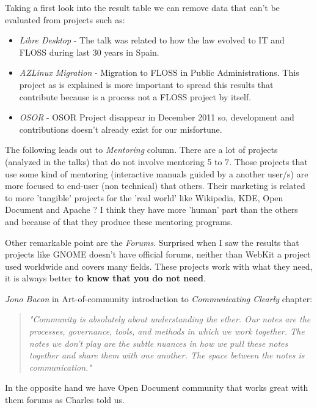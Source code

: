 \documentclass[11pt]{scrartcl}
\begin{document}
\par Taking a first look into the result table we can remove data that can't be evaluated from projects such as:
\begin{itemize}
	\item \emph{Libre Desktop} - The talk was related to how the law evolved to IT and FLOSS during last 30 years in Spain.
	\item \emph{AZLinux Migration} - Migration to FLOSS in Public Administrations. This project as is explained is more important to spread this results that contribute because is a process not a FLOSS project by itself.
	\item \emph{OSOR} - OSOR Project disappear in December 2011 so, development and contributions doesn't already exist for our misfortune.
\end{itemize}

\par The following leads out to \emph{Mentoring} column. There are a lot of projects (analyzed in the talks) that do not involve mentoring 5 to 7. Those projects that use some kind of mentoring (interactive manuals guided by a another user/s) are more focused to end-user (non technical) that others. Their marketing is related to more 'tangible' projects for the 'real world' like Wikipedia, KDE, Open Document and Apache ? I think they have more 'human' part than the others and because of that they produce these mentoring programs.

\par Other remarkable point are the \emph{Forums}. Surprised when I saw the results that projects like GNOME doesn't have official forums, neither than WebKit a project used worldwide and covers many fields. These projects work with what they need, it is always better \textbf{to know that you do not need}.

\emph{Jono Bacon} in Art-of-community introduction to \emph{Communicating Clearly} chapter:
\begin{quotation}
    \emph{"Community is absolutely about understanding the ether. Our notes are the processes, governance, tools, and methods in which we work together. The notes we don’t play are the subtle nuances in how we pull these notes together and share them with one another. The space between the notes is communication."}
\end{quotation}

\par In the opposite hand we have Open Document community that works great with them forums as Charles told us.
\end{document}
